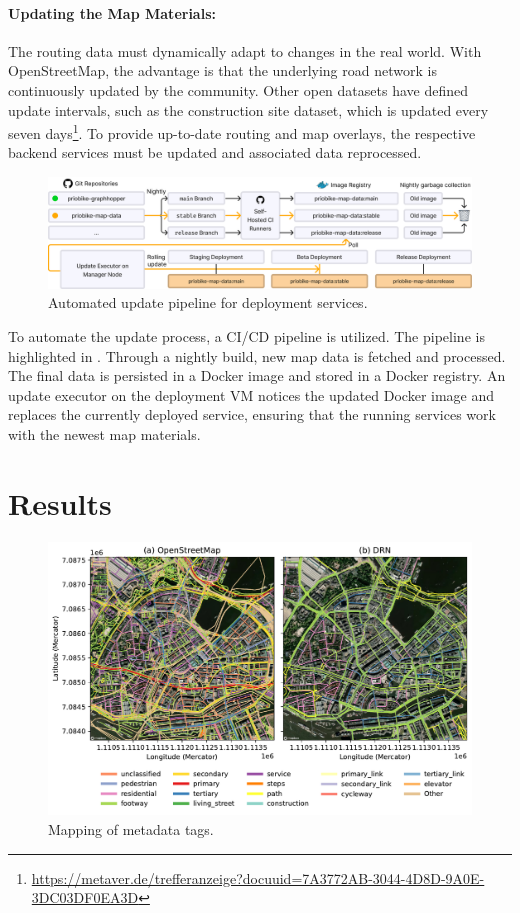 \paragraph{Updating the Map Materials:} The routing data must dynamically adapt to changes in the real world. With OpenStreetMap, the advantage is that the underlying road network is continuously updated by the community. Other open datasets have defined update intervals, such as the construction site dataset, which is updated every seven days\footnote{\url{https://metaver.de/trefferanzeige?docuuid=7A3772AB-3044-4D8D-9A0E-3DC03DF0EA3D}}. To provide up-to-date routing and map overlays, the respective backend services must be updated and associated data reprocessed. 

\begin{figure}[htbp]
\centering
\includegraphics[width=\linewidth]{images/multi-stage-continuous-deployment.png}
\caption{Automated update pipeline for deployment services.}
\label{fig:multi-stage-continuous-deployment}
\end{figure}

To automate the update process, a CI/CD pipeline is utilized. The pipeline is highlighted in . Through a nightly build, new map data is fetched and processed. The final data is persisted in a Docker image and stored in a Docker registry. An update executor on the deployment VM notices the updated Docker image and replaces the currently deployed service, ensuring that the running services work with the newest map materials.

\section{Results}

\begin{figure}[htbp]
\centering
\includegraphics[width=\linewidth]{images/routing-drn-osm-map.pdf}
\caption{Mapping of metadata tags.}
\label{fig:}
\end{figure}

